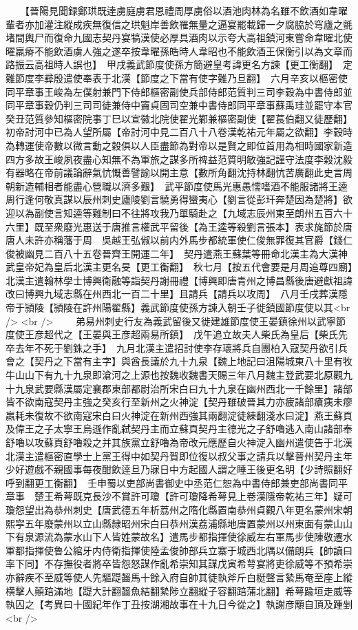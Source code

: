 　　【晉陽見聞録鄭珙既逹虜庭虜君恩禮周厚虜俗以酒池肉林為名雖不飲酒如韋曜輩者亦加灌注縱成疾無復信之珙魁岸善飲罹無量之逼宴罷載歸一夕腐脇於穹廬之氈堵間輿尸而復命九國志契丹宴犒漢使必厚具酒肉以示夸大高祖鎮河東嘗命韋曜北使曜羸瘠不能飲酒虜人強之遂卒按韋曜孫皓時人韋昭也不能飲酒王保衡引以為文章而路振云高祖時人誤也】　甲戌義武節度使孫方簡避皇考諱更名方諫【更工衡翻】　定難節度李彛殷遣使奉表于北漢【節度之下當有使字難乃旦翻】　六月辛亥以樞密使同平章事王峻為左僕射兼門下侍郎樞密副使兵部侍郎范質判三司李穀為中書侍郎並同平章事穀仍判三司司徒兼侍中竇貞固司空兼中書侍郎同平章事蘇禹珪並罷守本官癸丑范質參知樞密院事丁巳以宣徽北院使翟光鄴兼樞密副使【翟萇伯翻又徒歷翻】初帝討河中已為人望所屬【帝討河中見二百八十八卷漢乾祐元年屬之欲翻】李穀時為轉運使帝數以微言動之穀俱以人臣盡節為對帝以是賢之即位首用為相時國家新造四方多故王峻夙夜盡心知無不為軍旅之謀多所禆益范質明敏強記謹守法度李穀沈毅有器略在帝前議論辭氣忼慨善譬諭以開主意【數所角翻沈持林翻忼苦廣翻此史言周朝新造輔相者能盡心營職以濟多艱】　武平節度使馬光惠愚懦嗜酒不能服諸將王逵周行逢何敬真謀以辰州刺史廬陵劉言驍勇得蠻夷心【劉言從彭玕奔楚因為楚將】欲迎以為副使言知逵等難制曰不往將攻我乃單騎赴之【九域志辰州東至朗州五百六十六里】既至衆廢光惠送于唐推言權武平留後【為王逵等殺劉言張本】表求旄節於唐唐人未許亦稱藩于周　吳越王弘俶以前内外馬步都統軍使仁俊無罪復其官爵【錢仁俊被幽見二百八十五卷晉齊王開運二年】　契丹遣燕王蘇葉等冊命北漢主為大漢神武皇帝妃為皇后北漢主更名旻【更工衡翻】　秋七月【按五代會要是月周追尊四廟】北漢主遣翰林學士博興衛融等詣契丹謝冊禮【博興即唐青州之博昌縣後唐避獻祖諱改曰博興九域志縣在州西北一百二十里】且請兵【請兵以攻周】　八月壬戌葬漢隱帝于頴陵【頴陵在許州陽翟縣】義武節度使孫方諫入朝壬子徙鎮國節度使以其<br />
<br />
　　弟易州刺史行友為義武留後又徙建雄節度使王晏鎮徐州以武寧節度使王彦超代之【王晏與王彦超兩易所鎮】　戊午追立故夫人柴氏為皇后【柴氏先卒去年不死于劉銖之手】　九月北漢主遣招討使李存瓌將兵自團柏入寇契丹欲引兵會之【契丹之下當有主字】與酋長議於九十九泉【魏上地記曰沮陽城東八十里有牧牛山山下有九十九泉即滄河之上源也按魏收魏書天賜三年八月魏主登武要北原觀九十九泉武要縣漢屬定襄郡東部都尉治所宋白曰九十九泉在幽州西北一千餘里】諸部皆不欲南寇契丹主強之癸亥行至新州之火神淀【契丹雖破晉其力亦疲諸部瘡痍未瘳羸耗未復故不欲南寇宋白曰火神淀在新州西強其兩翻淀徒練翻淺水曰淀】燕王蘇頁及偉王之子太寧王烏遜作亂弑契丹主而立蘇頁契丹主德光之子舒嚕逃入南山諸部奉舒嚕以攻蘇頁舒嚕殺之并其族黨立舒嚕為帝改元應歷自火神淀入幽州遣使告于北漢北漢主遣樞密直學士上黨王得中如契丹賀即位復以叔父事之請兵以擊晉州契丹主年少好遊戲不親國事每夜酣飲逹旦乃寐日中方起國人謂之睡王後更名明【少詩照翻好呼到翻更工衡翻】　壬申蜀以吏部尚書御史中丞范仁恕為中書侍郎兼吏部尚書同平章事　楚王希萼既克長沙不賞許可瓊【許可瓊降希萼見上卷漢隱帝乾祐三年】疑可瓊怨望出為恭州刺史【唐武德五年析荔州之隋化縣置南恭州貞觀八年更名蒙州宋朝熙寜五年廢蒙州以立山縣隸昭州宋白曰恭州漢荔浦縣地唐置蒙州以州東面有蒙山山下有泉源流為蒙水山下人皆姓蒙故名】遣馬步都指揮使徐威左右軍馬步使陳敬遷水軍都指揮使魯公綰牙内侍衛指揮使陸孟俊帥部兵立寨于城西北隅以備朗兵【帥讀曰率下同】不存撫役者將卒皆怨怒謀作亂希崇知其謀戊寅希萼宴將吏徐威等不預希崇亦辭疾不至威等使人先驅踶齧馬十餘入府自帥其徒執斧斤白梃聲言縶馬奄至座上縱横擊人顛踣滿地【踶大計翻齧魚結翻縶陟立翻縱子容翻踣蒲北翻】希萼踰垣走威等執囚之【考異曰十國紀年作丁丑按湖湘故事在十九日今從之】執謝彦顒自頂及踵剉<br />
